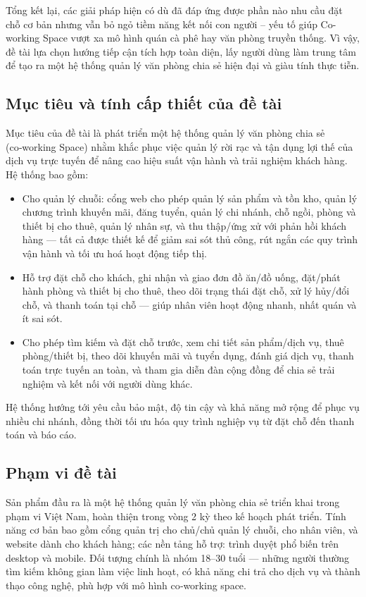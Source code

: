 Tổng kết lại, các giải pháp hiện có dù đã đáp ứng được phần nào nhu cầu đặt chỗ cơ bản nhưng vẫn bỏ ngỏ tiềm năng kết nối con người – yếu tố giúp Co-working Space vượt xa mô hình quán cà phê hay văn phòng truyền thống. Vì vậy, đề tài lựa chọn hướng tiếp cận tích hợp toàn diện, lấy người dùng làm trung tâm để tạo ra một hệ thống quản lý văn phòng chia sẻ hiện đại và giàu tính thực tiễn.

\subsection{Mục tiêu và tính cấp thiết của đề tài}
Mục tiêu của đề tài là phát triển một hệ thống quản lý văn phòng chia sẻ (co‑working Space) nhằm khắc phục việc quản lý rời rạc và tận dụng lợi thế của dịch vụ trực tuyến để nâng cao hiệu suất vận hành và trải nghiệm khách hàng. Hệ thống bao gồm:
\begin{itemize}
\item Cho quản lý chuỗi: cổng web cho phép quản lý sản phẩm và tồn kho, quản lý chương trình khuyến mãi, đăng tuyển, quản lý chi nhánh, chỗ ngồi, phòng và thiết bị cho thuê, quản lý nhân sự, và thu thập/ứng xử với phản hồi khách hàng — tất cả được thiết kế để giảm sai sót thủ công, rút ngắn các quy trình vận hành và tối ưu hoá hoạt động tiếp thị.
\item Hỗ trợ đặt chỗ cho khách, ghi nhận và giao đơn đồ ăn/đồ uống, đặt/phát hành phòng và thiết bị cho thuê, theo dõi trạng thái đặt chỗ, xử lý hủy/đổi chỗ, và thanh toán tại chỗ — giúp nhân viên hoạt động nhanh, nhất quán và ít sai sót.
\item Cho phép tìm kiếm và đặt chỗ trước, xem chi tiết sản phẩm/dịch vụ, thuê phòng/thiết bị, theo dõi khuyến mãi và tuyển dụng, đánh giá dịch vụ, thanh toán trực tuyến an toàn, và tham gia diễn đàn cộng đồng để chia sẻ trải nghiệm và kết nối với người dùng khác.
\end{itemize}
Hệ thống hướng tới yêu cầu bảo mật, độ tin cậy và khả năng mở rộng để phục vụ nhiều chi nhánh, đồng thời tối ưu hóa quy trình nghiệp vụ từ đặt chỗ đến thanh toán và báo cáo.
\subsection{Phạm vi đề tài}
Sản phẩm đầu ra là một hệ thống quản lý văn phòng chia sẻ triển khai trong phạm vi Việt Nam, hoàn thiện trong vòng 2 kỳ theo kế hoạch phát triển. Tính năng cơ bản bao gồm cổng quản trị cho chủ/chủ quản lý chuỗi, cho nhân viên, và website dành cho khách hàng; các nền tảng hỗ trợ: trình duyệt phổ biến trên desktop và mobile. Đối tượng chính là nhóm 18–30 tuổi — những người thường tìm kiếm không gian làm việc linh hoạt, có khả năng chi trả cho dịch vụ và thành thạo công nghệ, phù hợp với mô hình co‑working space.
